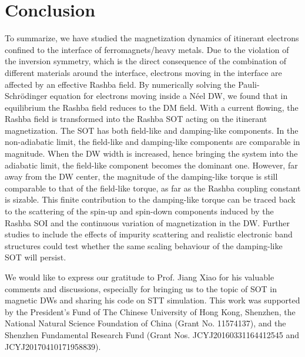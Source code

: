 \documentclass[12pt]{iopart}
\begin{document}
\section{Conclusion}
\label{conclusion}
To summarize, we have studied the magnetization dynamics of itinerant electrons confined to the interface of ferromagnets/heavy metals. Due to the violation of the inversion symmetry, which is the direct consequence of the combination of different materials around the interface, electrons moving in the interface are affected by an effective Rashba field. By numerically solving the Pauli-Schr\"{o}dinger equation for electrons moving inside a N\'{e}el DW, we found that in equilibrium the Rashba field reduces to the DM field. With a current flowing, the Rashba field is transformed into the Rashba SOT acting on the itinerant magnetization. The SOT has both field-like and damping-like components. In the non-adiabatic limit, the field-like and damping-like components are comparable in magnitude. When the DW width is increased, hence bringing the system into the adiabatic limit, the field-like component becomes the dominant one. However, far away from the DW center, the magnitude of the damping-like torque is still comparable to that of the field-like torque, as far as the Rashba coupling constant is sizable. This finite contribution to the damping-like torque can be traced back to the scattering of the spin-up and spin-down components induced by the Rashba SOI and the continuous variation of magnetization in the DW. Further studies to include the effects of impurity scattering and realistic electronic band structures could test whether the same scaling behaviour of the damping-like SOT will persist.

\ack
We would like to express our gratitude to Prof. Jiang Xiao for his valuable comments and discussions, especially for bringing us to the topic of SOT in magnetic DWs and sharing his code on STT simulation. This work was supported by the President's Fund of The Chinese University of Hong Kong, Shenzhen, the National Natural Science Foundation of China (Grant No. 11574137), and the Shenzhen Fundamental Research Fund (Grant Nos. JCYJ20160331164412545 and JCYJ20170410171958839).
\end{document}
